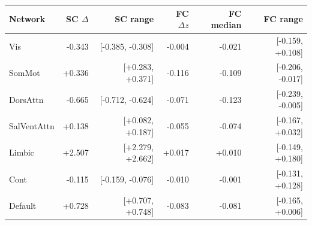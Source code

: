 \begin{tabular}{lrrrrr}
\toprule
Network & SC $\Delta$ & SC range & FC $\Delta z$ & FC median & FC range \\
\midrule
Vis & -0.343 & [-0.385, -0.308] & -0.004 & -0.021 & [-0.159, +0.108] \\
SomMot & +0.336 & [+0.283, +0.371] & -0.116 & -0.109 & [-0.206, -0.017] \\
DorsAttn & -0.665 & [-0.712, -0.624] & -0.071 & -0.123 & [-0.239, -0.005] \\
SalVentAttn & +0.138 & [+0.082, +0.187] & -0.055 & -0.074 & [-0.167, +0.032] \\
Limbic & +2.507 & [+2.279, +2.662] & +0.017 & +0.010 & [-0.149, +0.180] \\
Cont & -0.115 & [-0.159, -0.076] & -0.010 & -0.001 & [-0.131, +0.128] \\
Default & +0.728 & [+0.707, +0.748] & -0.083 & -0.081 & [-0.165, +0.006] \\
\bottomrule
\end{tabular}
